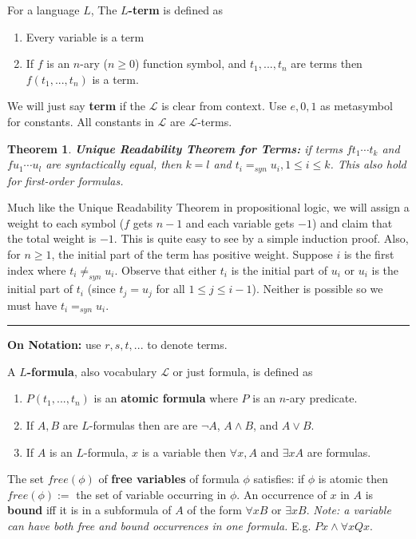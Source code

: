 \documentclass[twoside]{article}
\newcounter{lecnum}
\newtheorem{theorem}{Theorem}[lecnum]
\newenvironment{proof}{{\bf Proof:}}{\hfill\rule{2mm}{2mm}}
\def\L{\mathcal{L}}
\begin{document}
For a language $L$, The \textbf{$L$-term} is defined as
\begin{enumerate}
\item Every variable is a term
\item If $f$ is an $n$-ary ($n \geq 0$) function symbol, and $t_1, ..., t_n$ are terms then $f(t_1, ..., t_n)$ is a term. 
\end{enumerate}

We will just say \textbf{term} if the $\L$ is clear from context. Use $e, 0, 1$ as metasymbol for constants. All constants in $\L$ are $\L$-terms.

\begin{theorem}
\textbf{Unique Readability Theorem for Terms:} if terms $ft_1\cdots t_k$ and $fu_1\cdots u_l$ are syntactically equal, then $k = l$ and $t_i =_{syn} u_i, 1 \leq i \leq k$. This also hold for first-order formulas.
\end{theorem}
\begin{proof}
Much like the Unique Readability Theorem in propositional logic, we will assign a weight to each symbol ($f$ gets $n-1$ and each variable gets $-1$) and claim that the total weight is $-1$. This is quite easy to see by a simple induction proof. Also, for $n \geq 1$, the initial part of the term has positive weight. Suppose $i$ is the first index where $t_i \neq_{syn} u_i$. Observe that either $t_i$ is the initial part of $u_i$ or $u_i$ is the initial part of $t_i$ (since $t_j = u_j$ for all $1 \leq j \leq i-1$). Neither is possible so we must have $t_i =_{syn} u_i$.  
\end{proof}

\textbf{On Notation:} use $r,s,t, ...$ to denote terms. 

A \textbf{$L$-formula}, also vocabulary $\L$ or just formula, is defined as
\begin{enumerate}
\item $P(t_1, ..., t_n)$ is an \textbf{atomic formula} where $P$ is an $n$-ary predicate.
\item If $A, B$ are $L$-formulas then are are $\lnot A$, $A \land B$, and $A \lor B$.
\item If $A$ is an $L$-formula, $x$ is a variable then $\forall x, A$ and $\exists x A$ are formulas.
\end{enumerate}

The set $free(\phi)$ of \textbf{free variables} of formula $\phi$ satisfies: if $\phi$ is atomic then $free(\phi) :=$ the set of variable occurring in $\phi$. An occurrence of $x$ in $A$ is \textbf{bound} iff it is in a subformula of $A$ of the form $\forall x B$ or $\exists x B$. \emph{Note: a variable can have both free and bound occurrences in one formula.} E.g. $Px \land \forall x Q x$. 
\end{document}
